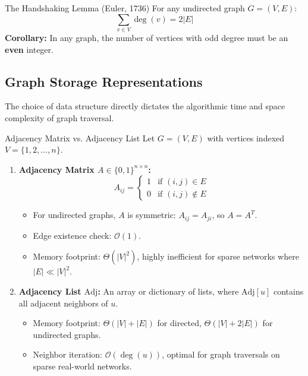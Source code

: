 \begin{theorembox}{The Handshaking Lemma (Euler, 1736)}
For any undirected graph $G = (V, E)$:
\begin{equation}
\sum_{v \in V} \deg(v) = 2|E|
\end{equation}
\textbf{Corollary:} In any graph, the number of vertices with odd degree must be an \textbf{even} integer.
\end{theorembox}

\subsection{Graph Storage Representations}

The choice of data structure directly dictates the algorithmic time and space complexity of graph traversal.

\begin{definitionbox}{Adjacency Matrix vs. Adjacency List}
Let $G = (V, E)$ with vertices indexed $V = \{1, 2, \dots, n\}$.
\begin{enumerate}
    \item \textbf{Adjacency Matrix $A \in \{0, 1\}^{n \times n}$:}
    \begin{equation}
    A_{ij} = \begin{cases} 1 & \text{if } (i, j) \in E \\ 0 & \text{if } (i, j) \notin E \end{cases}
    \end{equation}
    \begin{itemize}
        \item For undirected graphs, $A$ is symmetric: $A_{ij} = A_{ji}$, so $A = A^T$.
        \item Edge existence check: $\mathcal{O}(1)$.
        \item Memory footprint: $\Theta(|V|^2)$, highly inefficient for sparse networks where $|E| \ll |V|^2$.
    \end{itemize}
    \item \textbf{Adjacency List $\text{Adj}$:}
    An array or dictionary of lists, where $\text{Adj}[u]$ contains all adjacent neighbors of $u$.
    \begin{itemize}
        \item Memory footprint: $\Theta(|V| + |E|)$ for directed, $\Theta(|V| + 2|E|)$ for undirected graphs.
        \item Neighbor iteration: $\mathcal{O}(\deg(u))$, optimal for graph traversals on sparse real-world networks.
    \end{itemize}
\end{enumerate}
\end{definitionbox}


